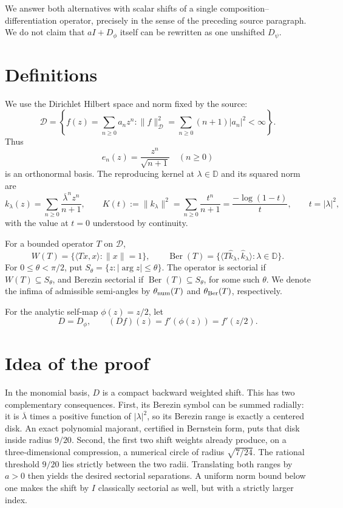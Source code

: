 \documentclass[11pt]{amsart}
\theoremstyle{definition}
\newcommand{\Dsp}{\mathcal D}
\newcommand{\Ber}{\operatorname{Ber}}
\newcommand{\Num}{W}
\begin{document}
We answer both alternatives with scalar shifts of a single
composition--differentiation operator, precisely in the sense of the preceding
source paragraph.  We do not claim that \(aI+D_\phi\) itself can be rewritten
as one unshifted \(D_\psi\).

\section{Definitions}

We use the Dirichlet Hilbert space and norm fixed by the source:
\[
 \Dsp=\left\{f(z)=\sum_{n\ge0}a_nz^n:
        \|f\|_{\Dsp}^{2}=\sum_{n\ge0}(n+1)|a_n|^2<\infty\right\}.
\]
Thus
\[
 e_n(z)=\frac{z^n}{\sqrt{n+1}}\quad(n\ge0)
\]
is an orthonormal basis.  The reproducing kernel at \(\lambda\in\mathbb D\)
and its squared norm are
\[
 k_\lambda(z)=\sum_{n\ge0}\frac{\overline\lambda^n z^n}{n+1},
 \qquad
 K(t):=\|k_\lambda\|^2=\sum_{n\ge0}\frac{t^n}{n+1}
       =\frac{-\log(1-t)}{t},
 \qquad t=|\lambda|^2,
\]
with the value at \(t=0\) understood by continuity.

For a bounded operator \(T\) on \(\Dsp\),
\[
 \Num(T)=\{\langle Tx,x\rangle:\|x\|=1\},\qquad
 \Ber(T)=\{\langle T\widehat k_\lambda,\widehat k_\lambda\rangle:
                 \lambda\in\mathbb D\}.
\]
For \(0\le\theta<\pi/2\), put
\(S_\theta=\{z:|\arg z|\le\theta\}\).  The operator is sectorial if
\(\Num(T)\subseteq S_\theta\), and Berezin sectorial if
\(\Ber(T)\subseteq S_\theta\), for some such \(\theta\).  We denote the
infima of admissible semi-angles by \(\theta_{\rm num}(T)\) and
\(\theta_{\rm Ber}(T)\), respectively.

For the analytic self-map \(\phi(z)=z/2\), let
\[
 D=D_\phi,\qquad (Df)(z)=f'(\phi(z))=f'(z/2).
\]

\section{Idea of the proof}

In the monomial basis, \(D\) is a compact backward weighted shift.  This has
two complementary consequences.  First, its Berezin symbol can be summed
radially: it is \(\overline\lambda\) times a positive function of
\(|\lambda|^2\), so its Berezin range is exactly a centered disk.  An exact
polynomial majorant, certified in Bernstein form, puts that disk inside radius
\(9/20\).  Second, the first two shift weights already produce, on a
three-dimensional compression, a numerical circle of radius
\(\sqrt{7/24}\).  The rational threshold \(9/20\) lies strictly between the
two radii.  Translating both ranges by \(a>0\) then yields the desired
sectorial separations.  A uniform norm bound below one makes the shift by
\(I\) classically sectorial as well, but with a strictly larger index.
\end{document}
